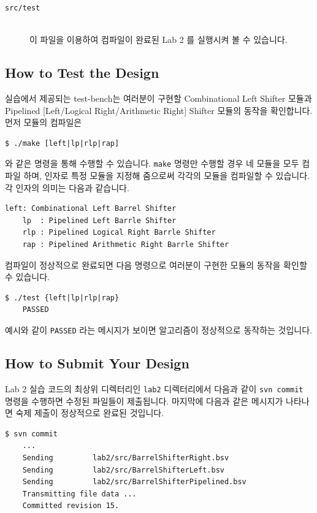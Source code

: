 \documentclass{article}
\begin{document}
\begin{description}
\item [\texttt{src/test}]\hfill \ \\
	이 파일을 이용하여 컴파일이 완료된 Lab 2 를 실행시켜 볼 수 있습니다.

\end{description}

\subsection{How to Test the Design}
실습에서 제공되는 test-bench는 여러분이 구현할 Combinational Left Shifter 모듈과 
Pipelined [Left/Logical Right/Arithmetic Right] Shifter 모듈의 동작을 확인합니다.
먼저 모듈의 컴파일은 

\begin{Verbatim}[frame=single]
    $ ./make [left|lp|rlp|rap]
\end{Verbatim}
와 같은 명령을 통해 수행할 수 있습니다. \texttt{make} 명령만 수행할 경우 네 모듈을 모두 컴파일 하며,
인자로 특정 모듈을 지정해 줌으로써 각각의 모듈을 컴파일할 수 있습니다. 각 인자의 의미는 다음과 같습니다.

\begin{Verbatim}[frame=single]
    left: Combinational Left Barrel Shifter
    lp  : Pipelined Left Barrle Shifter
    rlp : Pipelined Logical Right Barrle Shifter
    rap : Pipelined Arithmetic Right Barrle Shifter
\end{Verbatim}
컴파일이 정상적으로 완료되면 다음 명령으로 여러분이 구현한 모듈의 동작을 확인할 수 있습니다.

\begin{Verbatim}[frame=single]
    $ ./test {left|lp|rlp|rap}
    PASSED
\end{Verbatim}
예시와 같이 \texttt{PASSED} 라는 메시지가 보이면 알고리즘이 정상적으로 동작하는 것입니다.

\subsection{How to Submit Your Design}
Lab 2 실습 코드의 최상위 디렉터리인  \texttt{lab2} 디렉터리에서
다음과 같이 \texttt{svn commit} 명령을 수행하면 수정된 파일들이 제출됩니다.
마지막에 다음과 같은 메시지가 나타나면 숙제 제출이 정상적으로 완료된 것입니다.

\begin{Verbatim}[frame=single]
    $ svn commit
    ...
    Sending         lab2/src/BarrelShifterRight.bsv
    Sending         lab2/src/BarrelShifterLeft.bsv
    Sending         lab2/src/BarrelShifterPipelined.bsv
    Transmitting file data ...
    Committed revision 15.
\end{Verbatim}
\end{document}
